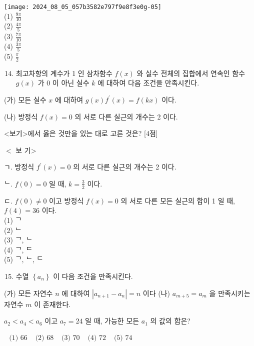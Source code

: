 \documentclass[10pt]{article}
\begin{document}
\texttt{[image: 2024\_08\_05\_057b3582e797f9e8f3e0g-05]}\\
(1) \(\frac{9 \pi}{10}\)\\
(2) \(\frac{4 \pi}{5}\)\\
(3) \(\frac{7 \pi}{10}\)\\
(4) \(\frac{3 \pi}{5}\)\\
(5) \(\frac{\pi}{2}\)

\begin{enumerate}
  \setcounter{enumi}{13}
  \item 최고차항의 계수가 1 인 삼차함수 \(f(x)\) 와 실수 전체의 집합에서 연속인 함수 \(g(x)\) 가 0 이 아닌 실수 \(k\) 에 대하여 다음 조건을 만족시킨다.
\end{enumerate}

(가) 모든 실수 \(x\) 에 대하여 \(g(x) f^{\prime}(x)=f(k x)\) 이다.

(나) 방정식 \(f(x)=0\) 의 서로 다른 실근의 개수는 2 이다.

<보기>에서 옳은 것만을 있는 대로 고른 것은? [4점]

\(<\) 보 기>

ㄱ. 방정식 \(f^{\prime}(x)=0\) 의 서로 다른 실근의 개수는 2 이다.

ᄂ. \(f(0)=0\) 일 때, \(k=\frac{3}{2}\) 이다.

ㄷ. \(f(0) \neq 0\) 이고 방정식 \(f(x)=0\) 의 서로 다른 모든 실근의 합이 1 일 때, \(f(4)=36\) 이다.\\
(1) ᄀ\\
(2) ᄂ\\
(3) ᄀ, ᄂ\\
(4) ᄀ, ᄃ\\
(5) ᄀ, ᄂ, ᄃ

\begin{enumerate}
  \setcounter{enumi}{14}
  \item 수열 \(\left\{a_{n}\right\}\) 이 다음 조건을 만족시킨다.
\end{enumerate}

(가) 모든 자연수 \(n\) 에 대하여 \(\left|a_{n+1}-a_{n}\right|=n\) 이다 (나) \(a_{m+5}=a_{m}\) 을 만족시키는 자연수 \(m\) 이 존재한다.

\(a_{2}<a_{4}<a_{6}\) 이고 \(a_{7}=24\) 일 때, 가능한 모든 \(a_{1}\) 의 값의 합은?

\(\begin{array}{lllll}\text { (1) } 66 & \text { (2) } 68 & \text { (3) } 70 & \text { (4) } 72 & \text { (5) } 74\end{array}\)
\end{document}
